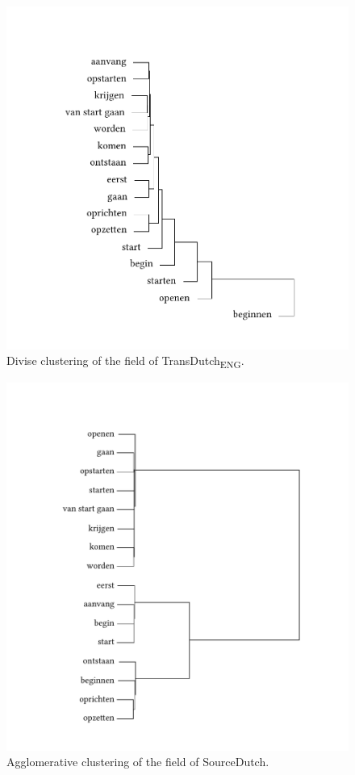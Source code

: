 \begin{figure}%
\includegraphics[height=.4\textheight,trim=0 20 0 50]{figures/tree28.pdf}
\caption{\label{fig:3:28}Divise clustering of the field of TransDutch\textsubscript{ENG}.}
\end{figure}

\begin{figure}%
\includegraphics[height=.4\textheight,trim=0 20 0 50]{figures/tree29.pdf}
\caption{\label{fig:3:29} Agglomerative clustering of the field of SourceDutch.}
\end{figure}

